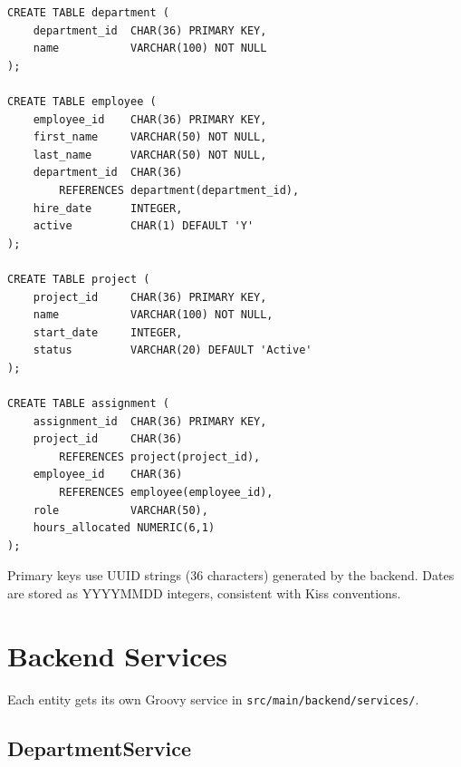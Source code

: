 \begin{lstlisting}[style=sql]
CREATE TABLE department (
    department_id  CHAR(36) PRIMARY KEY,
    name           VARCHAR(100) NOT NULL
);

CREATE TABLE employee (
    employee_id    CHAR(36) PRIMARY KEY,
    first_name     VARCHAR(50) NOT NULL,
    last_name      VARCHAR(50) NOT NULL,
    department_id  CHAR(36)
        REFERENCES department(department_id),
    hire_date      INTEGER,
    active         CHAR(1) DEFAULT 'Y'
);

CREATE TABLE project (
    project_id     CHAR(36) PRIMARY KEY,
    name           VARCHAR(100) NOT NULL,
    start_date     INTEGER,
    status         VARCHAR(20) DEFAULT 'Active'
);

CREATE TABLE assignment (
    assignment_id  CHAR(36) PRIMARY KEY,
    project_id     CHAR(36)
        REFERENCES project(project_id),
    employee_id    CHAR(36)
        REFERENCES employee(employee_id),
    role           VARCHAR(50),
    hours_allocated NUMERIC(6,1)
);
\end{lstlisting}

\noindent
Primary keys use UUID strings (36 characters) generated by the backend.  Dates are stored as YYYYMMDD integers, consistent with Kiss conventions.

\section{Backend Services}
\label{sec:app-services}

Each entity gets its own Groovy service in \texttt{src/main/backend/services/}.

\subsection{DepartmentService}

